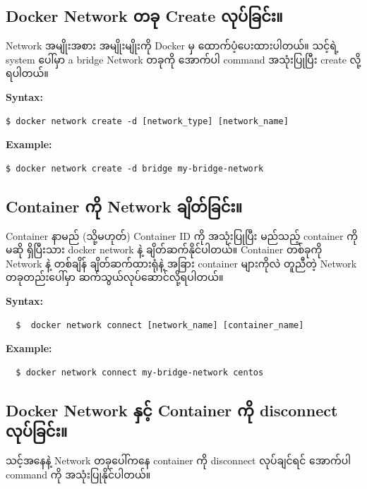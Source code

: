 \documentclass{article}
\begin{document}
\subsection{Docker Network တခု Create
လုပ်ခြင်း။}\label{docker-network-ux1010ux1001-create-ux101cux1015ux1001ux1004}

Network အမျိုးအစား အမျိုးမျိုးကို Docker မှ ထောက်ပံ့ပေးထားပါတယ်။ သင့်ရဲ့
system ပေါ်မှာ a bridge Network တခုကို အောက်ပါ command အသုံးပြုပြီး
create လို့ရပါတယ်။

\textbf{Syntax:}

\begin{verbatim}
$ docker network create -d [network_type] [network_name]
\end{verbatim}

\textbf{Example:}

\begin{verbatim}
$ docker network create -d bridge my-bridge-network
\end{verbatim}

\subsection{Container ကို Network
ချိတ်ခြင်း။}\label{container-ux1000-network-ux1001ux1010ux1001ux1004}

Container နာမည် (သို့မဟုတ်) Container ID ကို အသုံးပြုပြီး မည်သည့်
container ကိုမဆို ရှိပြီးသား docker network နဲ့ ချိတ်ဆက်နိုင်ပါတယ်။
Container တစ်ခုကို Network နဲ့ တစ်ချိန် ချိတ်ဆက်ထားရုံနဲ့ အခြား
container များကိုလဲ တူညီတဲ့ Network တခုတည်းပေါ်မှာ
ဆက်သွယ်လုပ်ဆောင်လို့ရပါတယ်။

\textbf{Syntax:}

\begin{verbatim}
  $  docker network connect [network_name] [container_name]
\end{verbatim}

\textbf{Example:}

\begin{verbatim}
  $ docker network connect my-bridge-network centos
\end{verbatim}

\subsection{Docker Network နှင့် Container ကို disconnect
လုပ်ခြင်း။}\label{docker-network-ux1014ux1004-container-ux1000-disconnect-ux101cux1015ux1001ux1004}

သင့်အနေနဲ့ Network တခုပေါ်ကနေ container ကို disconnect လုပ်ချင်ရင်
အောက်ပါ command ကို အသုံးပြုနိုင်ပါတယ်။
\end{document}

